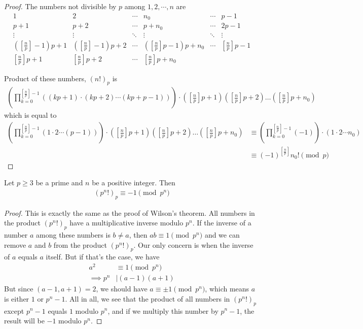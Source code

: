 \documentclass{subfile}
\begin{document}
	\begin{proof}
		The numbers not divisible by $p$ among $1, 2, \cdots, n$ are
			\[\begin{array}{*{20}{c}}
				1&2& \cdots &{{n_0}}& \cdots &{p - 1}\\
				{p + 1}&{p + 2}& \cdots &{p + {n_0}}& \cdots &{2p - 1}\\
				\vdots & \vdots & \ddots & \vdots & \ddots & \vdots \\
				{( {[\frac{n}{p}] - 1} )p + 1}&{( {[\frac{n}{p}] - 1} )p + 2}& \cdots &{( {[\frac{n}{p}]p - 1} )p + {n_0}}& \cdots &{[\frac{n}{p}]p - 1}\\
				{[\frac{n}{p}]p + 1}&{[\frac{n}{p}]p + 2}& \cdots &{[\frac{n}{p}]p + {n_0}}&{}&{}
			\end{array}\]

	Product of these numbers, $(n!)_p$ is
		\begin{align*}
			\left(\prod_{k=0}^{[\frac np]-1}\!\!\left((kp+1)\cdot(kp+2)\cdots(kp+p-1)\right)\right)  \cdot
			\left([\tfrac np]p+1\right)\left([\tfrac np]p+2\right)\dots\left([\tfrac np]p+n_0\right)
		\end{align*}
	which is equal to
		\begin{align*}
			\left(\prod_{k=0}^{[\frac np]-1}\!\!\left(1\cdot2\cdots(p-1)\right)\right)  \cdot
			\left([\tfrac np]p+1\right)\left([\tfrac np]p+2\right)\dots\left([\tfrac np]p+n_0\right)
				& \equiv \left(\prod_{k=0}^{[\frac np]-1}\!\!\left(-1\right) \right) \cdot \left(
				1 \cdot 2 \cdots n_0\right)\\
				& \equiv(-1)^{[\frac np]} n_0!\pmod p
		\end{align*}
	\end{proof}


	\begin{proposition}
		Let $p\geq 3$ be a prime and $n$ be a positive integer. Then
			\begin{align*}
				(p^n!)_p \equiv -1 \pmod{p^n}
			\end{align*}
	\end{proposition}

	\begin{proof}
		This is exactly the same as the proof of Wilson's theorem. All numbers in the product $(p^n!)_p$ have a multiplicative inverse modulo $p^n$. If the inverse of a number $a$ among these numbers is $b \neq a$, then $a b \equiv 1 \pmod{p^n}$ and we can remove $a$ and $b$ from the product $(p^n!)_p$. Our only concern is when the inverse of $a$ equals $a$ itself. But if that's the case, we have
			\begin{align*}
				a^2
					& \equiv 1 \pmod{p^n}\\
				\implies p^n
					& \mid (a-1)(a+1)
			\end{align*}
		But since $(a-1,a+1)=2$, we should have $a \equiv \pm 1 \pmod{p^n}$, which means $a$ is either $1$ or $p^n-1$. All in all, we see that the product of all numbers in $(p^n!)_p$ except $p^n-1$ equals $1$ modulo $p^n$, and if we multiply this number by $p^n-1$, the result will be $-1$ modulo $p^n$.
	\end{proof}
\end{document}
